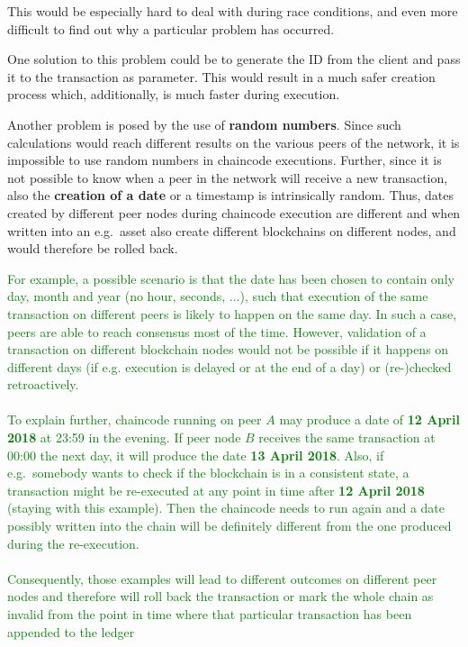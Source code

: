 This would be especially hard to deal with during race conditions, and even more difficult to find out why a particular problem has occurred.

One solution to this problem could be to generate the ID from the client and pass it to the transaction as parameter. This would result in a much safer creation process which, additionally, is much faster during execution.

Another problem is posed by the use of \textbf{random numbers}. Since such calculations would reach different results on the various peers of the network, it is impossible to use random numbers in chaincode executions. Further, since it is not possible to know when a peer in the network will receive a new transaction, also the \textbf{creation of a date} or a timestamp is intrinsically random. Thus, dates created by different peer nodes during chaincode execution are different and when written into an e.g.\ asset also create different blockchains on different nodes, and would therefore be rolled back.

\textcolor{green}{For example, a possible scenario is that the date has been chosen to contain only day, month and year (no hour, seconds, ...), such that execution of the same transaction on different peers is likely to happen on the same day. In such a case, peers are able to reach consensus most of the time. However, validation of a transaction on different blockchain nodes would not be possible if it happens on different days (if e.g. execution is delayed or at the end of a day) or (re-)checked retroactively.\\\\To explain further, chaincode running on peer $A$ may produce a date of \textbf{12 April 2018} at 23:59 in the evening. If peer node $B$ receives the same transaction at 00:00 the next day, it will produce the date \textbf{13 April 2018}. Also, if e.g.\ somebody wants to check if the blockchain is in a consistent state, a transaction might be re-executed at any point in time after \textbf{12 April 2018} (staying with this example). Then the chaincode needs to run again and a date possibly written into the chain will be definitely different from the one produced during the re-execution.\\\\
Consequently, those examples will lead to different outcomes on different peer nodes and therefore will roll back the transaction or mark the whole chain as invalid from the point in time where that particular transaction has been appended to the ledger}

